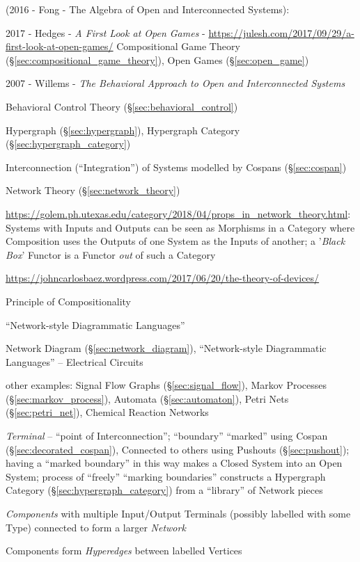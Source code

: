 (2016 - Fong - The Algebra of Open and Interconnected Systems):

2017 - Hedges - \emph{A First Look at Open Games} -
\url{https://julesh.com/2017/09/29/a-first-look-at-open-games/} \fist
Compositional Game Theory (\S\ref{sec:compositional_game_theory}), Open Games
(\S\ref{sec:open_game})

2007 - Willems - \emph{The Behavioral Approach to Open and Interconnected
  Systems}

\fist Behavioral Control Theory (\S\ref{sec:behavioral_control})

\fist Hypergraph (\S\ref{sec:hypergraph}), Hypergraph Category
(\S\ref{sec:hypergraph_category})

Interconnection (``Integration'') of Systems modelled by Cospans
(\S\ref{sec:cospan})

\fist Network Theory (\S\ref{sec:network_theory})

\url{https://golem.ph.utexas.edu/category/2018/04/props_in_network_theory.html}:
Systems with Inputs and Outputs can be seen as Morphisms in a Category where
Composition uses the Outputs of one System as the Inputs of another; a
'\emph{Black Box}' Functor is a Functor \emph{out} of such a Category

\url{https://johncarlosbaez.wordpress.com/2017/06/20/the-theory-of-devices/}

Principle of Compositionality

``Network-style Diagrammatic Languages''

Network Diagram (\S\ref{sec:network_diagram}), ``Network-style
Diagrammatic Languages'' -- Electrical Circuits

other examples: Signal Flow Graphs (\S\ref{sec:signal_flow}),
Markov Processes (\S\ref{sec:markov_process}), Automata
(\S\ref{sec:automaton}), Petri Nets (\S\ref{sec:petri_net}), Chemical
Reaction Networks

\emph{Terminal} -- ``point of Interconnection''; ``boundary''
``marked'' using Cospan (\S\ref{sec:decorated_cospan}), Connected to
others using Pushouts (\S\ref{sec:pushout}); having a ``marked
boundary'' in this way makes a Closed System into an Open System;
process of ``freely''  ``marking boundaries'' constructs a Hypergraph
Category (\S\ref{sec:hypergraph_category}) from a ``library'' of
Network pieces

\emph{Components} with multiple Input/Output Terminals (possibly
labelled with some Type) connected to form a larger \emph{Network}

Components form \emph{Hyperedges} between labelled Vertices


